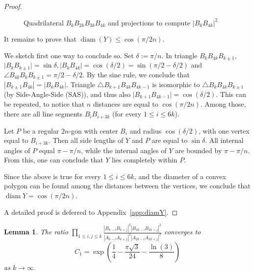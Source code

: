 \documentclass{article}
\DeclareMathOperator{\diam}{diam}
\newtheorem{lem}[thr]{Lemma}
\theoremstyle{definition}
\let\le\leqslant
\let\leq\leqslant
\newcommand{\abs}[1]{\left|#1\right|}
\begin{document}
\begin{proof}
\begin{figure}[h]
\begin{tikzpicture}[scale=1.25, main_node/.style={fill,draw,minimum size=0.1,circle,inner sep=2pt]
\end{tikzpicture}
\caption{Quadrilateral $B_kB_{2k}B_{3k}B_{4k}$ and projections to compute $\abs{B_k B_{4k}}^2$}\label{fig:det_diam_Y}
\end{figure}

It remains to prove that $\diam(Y)\leq \cos(\pi/2n)$.


We sketch first one way to conclude so.
Set $\delta:=\pi/n$.
In triangle $B_k B_{4k} B_{k \pm 1}$, $\lvert B_k B_{k \pm 1} \rvert = \sin \delta, \lvert B_k B_{4k} \rvert= \cos( \delta /2)= \sin( \pi/2- \delta /2)$ and $\angle B_{4k} B_k B_{k \pm 1}=  \pi/2- \delta /2. $
By the sine rule, we conclude that $\abs{B_{k\pm 1}B_{4k}}=\abs{B_kB_{4k}}.$
Triangle $\triangle B_{k+1} B_{4k} B_{4k-1}$ is isomorphic to $\triangle B_k B_{4k} B_{k \pm 1}$ (by Side-Angle-Side (SAS)), and thus also $\lvert B_{k+1} B_{4k-1} \rvert= \cos( \delta /2)$.
This can be repeated, to notice that $n$ distances are equal to $\cos(\pi/2n).$
Among those, there are all line segments $B_i B_{i+3k}$ (for every $1 \le i \le 6k$).

Let $P$ be a regular $2n$-gon with center $B_i$ and radius $\cos( \delta /2)$, with one vertex equal to $B_{i+3k}$.
Then all side lengths of $Y$ and $P$ are equal to $\sin \delta.$
All internal angles of $P$ equal $\pi-\pi/n$, while the internal angles of $Y$ are bounded by $\pi-\pi/n$. From this, one can conclude that $Y$ lies completely within $P$.

Since the above is true for every $1 \le i \le 6k$, and the diameter of a convex polygon can be found among the distances between the vertices, we conclude that $\diam Y= \cos(\pi/2n)$.


A detailed proof is deferred to Appendix~\ref{app:diamY}.
\end{proof}

\begin{lem}\label{lem:2ndregime}
    The ratio $\prod_{ 1 \le i,j \le k } \frac{\abs{B_{k-i}B_{k+j}}^2\abs{B_{2k-i}B_{2k+j}}^2}{\abs{A_{k-i}A_{k+j}}^2\abs{A_{2k-i}A_{2k+j}}^2}$ converges to $$C_1=\exp\left(\frac{1}{4}-\frac{\pi\sqrt3}{24}-\frac{\ln (3)}{8}\right)$$ as $k \to \infty.$
\end{lem}
\end{document}
